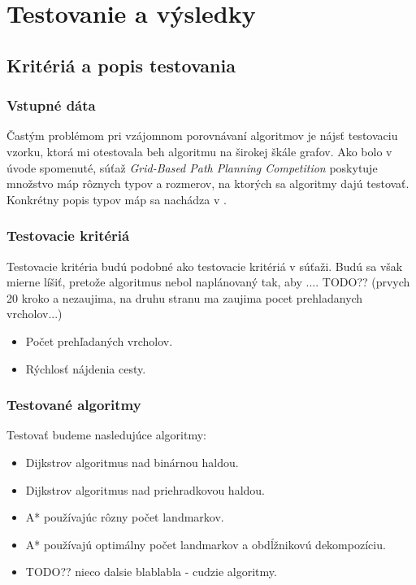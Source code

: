 \chapter{Testovanie a výsledky}

\section{Kritériá a popis testovania}
\subsection{Vstupné dáta}
Častým problémom pri vzájomnom porovnávaní algoritmov je
nájsť testovaciu vzorku, ktorá mi otestovala beh algoritmu na širokej škále grafov.
Ako bolo v úvode spomenuté, súťaž {\sl Grid-Based Path Planning Competition} poskytuje množstvo máp rôznych typov a rozmerov,
na ktorých sa algoritmy dajú testovať. Konkrétny popis typov máp sa nachádza v \cite{sturtevant2012benchmarks}.

\subsection{Testovacie kritériá}
Testovacie kritéria budú podobné ako testovacie kritériá v súťaži. Budú sa však mierne líšiť, pretože algoritmus nebol 
naplánovaný tak, aby .... TODO?? (prvych 20 kroko a nezaujima, na druhu stranu ma zaujima pocet prehladanych vrcholov...)

\begin{itemize}
\item Počet prehľadaných vrcholov.
\item Rýchlosť nájdenia cesty.
\end{itemize}


\subsection{Testované algoritmy}
Testovať budeme nasledujúce algoritmy:
\begin{itemize}
\item Dijkstrov algoritmus nad binárnou haldou.
\item Dijkstrov algoritmus nad priehradkovou haldou.
\item A* používajúc rôzny počet landmarkov.
\item A* používajú optimálny počet landmarkov a obdĺžnikovú dekompozíciu.
\item TODO?? nieco dalsie blablabla - cudzie algoritmy.
\end{itemize}


